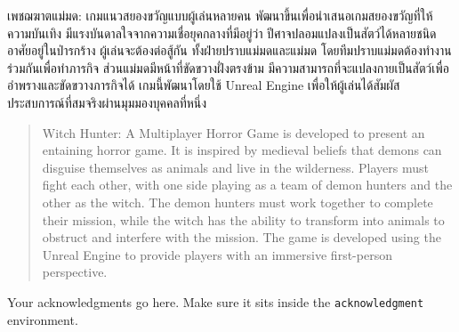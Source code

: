 \maketitle
\makesignature

\ifproject
\begin{abstractTH}
เพชฌฆาตแม่มด: เกมแนวสยองขวัญแบบผู้เล่นหลายคน พัฒนาขึ้นเพื่อนำเสนอเกมสยองขวัญที่ให้ความบันเทิง มีแรงบันดาลใจจากความเชื่อยุคกลางที่มีอยู่ว่า ปีศาจปลอมแปลงเป็นสัตว์ได้หลายชนิด อาศัยอยู่ในป่ารกร้าง ผู้เล่นจะต้องต่อสู้กัน ทั้งฝ่ายปราบแม่มดและแม่มด โดยทีมปราบแม่มดต้องทำงานร่วมกันเพื่อทำภารกิจ ส่วนแม่มดมีหน้าที่ขัดขวางฝั่งตรงข้าม มีความสามารถที่จะแปลงกายเป็นสัตว์เพื่ออำพรางและขัดขวางภารกิจได้ เกมนี้พัฒนาโดยใช้ Unreal Engine เพื่อให้ผู้เล่นได้สัมผัสประสบการณ์ที่สมจริงผ่านมุมมองบุคคลที่หนึ่ง
\end{abstractTH}

\begin{abstract}
Witch Hunter: A Multiplayer Horror Game is developed to present an entaining horror game. It is inspired by medieval beliefs that demons can disguise themselves as animals and live in the wilderness. Players must fight each other, with one side playing as a team of demon hunters and the other as the witch. The demon hunters must work together to complete their mission, while the witch has the ability to transform into animals to obstruct and interfere with the mission. The game is developed using the Unreal Engine to provide players with an immersive first-person perspective.
\end{abstract}
\iffalse
\begin{dedication}
This document is dedicated to all Chiang Mai University students.

Dedication page is optional.
\end{dedication}
\fi %

\begin{acknowledgments}
Your acknowledgments go here. Make sure it sits inside the
\texttt{acknowledgment} environment.

\end{acknowledgments}%
\fi %

\contentspage

\ifproject
\figurelistpage

\tablelistpage
\fi %



